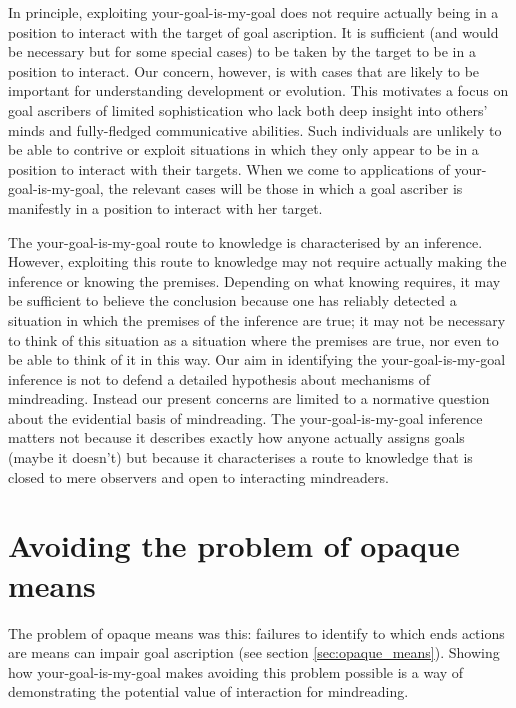 \documentclass[12pt,a4paper]{extarticle}
\begin{document}
In principle,
exploiting your-goal-is-my-goal does not require actually being in a position to interact with the target of goal ascription.
It is sufficient (and would be necessary but for some special cases) to be taken by the target to be in a position to interact. 
Our concern, however,
is with cases that are likely to be important for understanding
development or evolution.
This motivates a focus on goal ascribers of limited sophistication
who lack both deep insight into others' minds and fully-fledged communicative abilities.
Such individuals are unlikely to be able to contrive or exploit situations in which they only appear to be in a position to interact with their targets.
When we come to applications of your-goal-is-my-goal, the relevant cases will be those 
in which a goal ascriber is manifestly in a position to interact with her target.


The your-goal-is-my-goal route to knowledge is characterised by an inference.  
However, exploiting this route to knowledge may not require actually making the inference or knowing the premises.  
Depending on what knowing requires,
it may be sufficient to believe the conclusion because one has reliably detected a situation in which the premises of the inference are true;
it may not be necessary to think of this situation as a situation where the premises are true,
nor even to be able to think of it in this way.
Our aim in identifying the your-goal-is-my-goal inference is not to 
defend a detailed hypothesis about  mechanisms of mindreading.
Instead our present concerns are limited to a normative question about the evidential basis of mindreading.
The your-goal-is-my-goal inference matters
not because it describes exactly how anyone actually assigns goals (maybe it doesn't)
but because 
it characterises a route to knowledge
that is closed to mere observers
and open to interacting mindreaders.
 

\section{Avoiding the problem of opaque means}

The problem of opaque means was this:
 failures to identify to which ends actions are means can impair goal ascription (see section \vref{sec:opaque_means}).
Showing how your-goal-is-my-goal makes  avoiding this problem possible is a way of demonstrating the potential value   of interaction for mindreading. 
\end{document}

